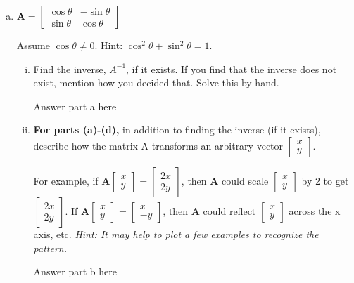 \documentclass[11pt]{article}
\def\A{\textbf{A}} %
\begin{document}
\begin{enumerate}
\begin{enumerate}[(a)]
	      	\newpage
	      	\item $\A = \begin{bmatrix}
	      	      \cos{\theta} & -\sin{\theta} \\
	      	      \sin{\theta} & \cos{\theta}
	      	\end{bmatrix}$
	      		      		                        
	      	Assume $\cos{\theta} \neq 0$. Hint: $\cos^2{\theta} + \sin^2{\theta} = 1$.
	      	\begin{enumerate}[i.]
	      		\item Find the inverse, $A^{-1}$, if it exists. If you find that the inverse does not exist, mention how you decided that. Solve this by hand.
	      		      \begin{Answer}
	      		      	Answer part a here
	      		      \end{Answer}
	      		\item \textbf{For parts (a)-(d),} in addition to finding the inverse (if it exists), describe how the matrix A transforms an arbitrary vector $\begin{bmatrix}
	      		      x \\
	      		      y
	      		\end{bmatrix}$.
	      			      		                    
	      		For example, if $\A \begin{bmatrix}
	      		x \\
	      		y
	      		\end{bmatrix} = \begin{bmatrix}
	      		2x \\
	      		2y
	      		\end{bmatrix}$, then $\A$ could scale $\begin{bmatrix}
	      		x \\
	      		y
	      		\end{bmatrix}$ by 2 to get $\begin{bmatrix}
	      		2x \\
	      		2y
	      		\end{bmatrix}$. If $\A \begin{bmatrix}
	      		x \\
	      		y
	      		\end{bmatrix}
	      		=
	      		\begin{bmatrix}
	      			x  \\
	      			-y 
	      		\end{bmatrix}$, then $\A$ could reflect $\begin{bmatrix}
	      		x \\
	      		y
	      		\end{bmatrix}$ across the x axis, etc. \textit{Hint: It may help to plot a few examples to recognize the pattern.}
	      		\begin{Answer}
	      			Answer part b here
	      		\end{Answer}
	      	\end{enumerate}
	      		      		                    

\end{enumerate}
\end{enumerate}
\end{document}
